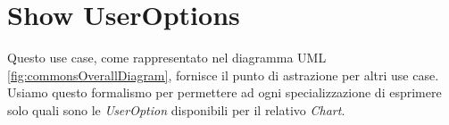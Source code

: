 \section{Show UserOptions}
\label{seq:showUserOptions}
Questo use case, come rappresentato nel diagramma UML
\autoref{fig:commonsOverallDiagram}, fornisce il punto di astrazione per altri
use case. Usiamo questo formalismo per permettere ad ogni specializzazione di
esprimere solo quali sono le \emph{UserOption} disponibili per il relativo
\emph{Chart}.
